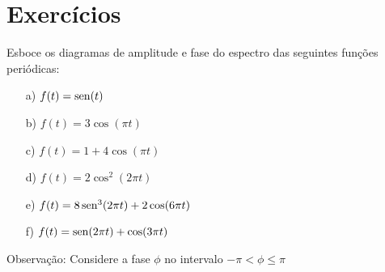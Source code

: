 \section{Exercícios}

\begin{Exercise}
Esboce os diagramas de amplitude e fase do espectro das seguintes funções periódicas:
\begin{itemize}
\item[a)] $f(t)=\operatorname{sen}(t)$\
\item[b)] $f(t)=3\cos(\pi t)$
\item[c)] $f(t)=1+4\cos(\pi t)$
\item[d)] $f(t)=2\cos^2(2\pi t)$
\item[e)] $f(t)=8\operatorname{sen}^3(2\pi t)+2\cos(6\pi t)$
\item[f)] $f(t)=\operatorname{sen}(2\pi t)+\cos(3\pi t)$
\end{itemize}
Observação: Considere a fase $\phi$ no intervalo $-\pi< \phi\leq \pi$
\end{Exercise}



